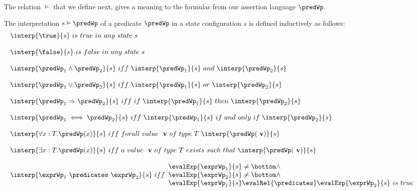  
The relation $\vDash$ that we define next, gives a meaning to the formulas from our
 assertion language $\predWp$.
 
\begin{interpPred} \label{interpPred} 
The interpretation $ s \vDash \predWp$ of a predicate $\predWp$ in a state configuration $s$ is defined inductively as follows:
$$
\begin{array}{l}
\interp{\true}{s} \  is \ true \ in \ any \ state \ s \\
\\
\interp{\false}{s} \ is \ false \ in \ any \ state \ s \\
\\

\interp{\predWp_1  \wedge  \predWp_2 }{s} \ iff \ \interp{\predWp_1}{s} \ and \ \interp{\predWp_2}{s}  \\
\\

\interp{\predWp_1  \vee  \predWp_2 }{s} \ iff \ \interp{\predWp_1}{s} \ or \ \interp{\predWp_2}{s}  \\
\\
\interp{\predWp_1  \Rightarrow  \predWp_2 }{s} \ iff \ if \ \interp{\predWp_1}{s} \ then \ \interp{\predWp_2}{s}  \\
\\
\interp{\predWp_1  \iff \predWp_2 }{s} \ iff \  \interp{\predWp_1}{s} \ if \ and \ only \ if  \ \interp{\predWp_2}{s}  \\
\\
\interp{\forall x : T .  \predWp(x)   }{s} \ iff \ forall \ value \ \mbox{ \rm \textbf{v}} \ of \  type \  T \ \interp{\predWp(\mbox{ \rm \textbf{v}})}{s}  \\
\\

\interp{\exists x : T .  \predWp(x)   }{s} \ iff \ a \ value \ \mbox{ \rm \textbf{v}} \ of \  type \  T \ exists \ such \ that \ \interp{\predWp(\mbox{ \rm \textbf{v}})}{s}  \\
\\
\interp{\exprWp_1 \  \predicates \  \exprWp_2 }{s} \ iff \begin{array}{l}
                                                              \evalExp{\exprWp_1 }{s} \neq \bottom \wedge \\
							       \evalExp{\exprWp_2 }{s}\neq \bottom \wedge \\
                                                             \evalExp{\exprWp_1 }{s} \evalRel{\predicates }  \evalExp{\exprWp_2 }{s} \ is  \ true
							     \end{array}
\end{array}
$$   
\end{interpPred}
